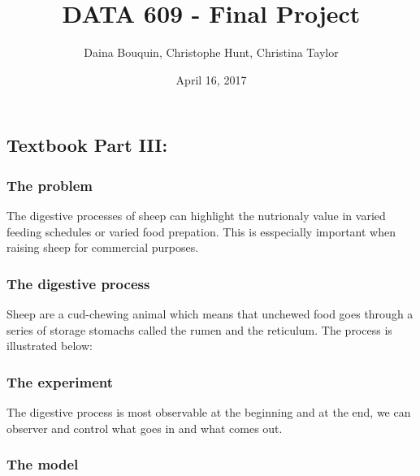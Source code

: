 \documentclass[]{article}
\title{DATA 609 - Final Project}
\author{Daina Bouquin, Christophe Hunt, Christina Taylor}
\date{April 16, 2017}
\begin{document}
\maketitle

{
\setcounter{tocdepth}{2}
\tableofcontents
}
\subsection{Textbook Part III:}\label{textbook-part-iii}

\subsubsection{The problem}\label{the-problem}

The digestive processes of sheep can highlight the nutrionaly value in
varied feeding schedules or varied food prepation. This is esspecially
important when raising sheep for commercial purposes.

\subsubsection{The digestive process}\label{the-digestive-process}

Sheep are a cud-chewing animal which means that unchewed food goes
through a series of storage stomachs called the rumen and the reticulum.
The process is illustrated below:


\subsubsection{The experiment}\label{the-experiment}

The digestive process is most observable at the beginning and at the
end, we can observer and control what goes in and what comes out.

\subsubsection{The model}\label{the-model}
\end{document}
